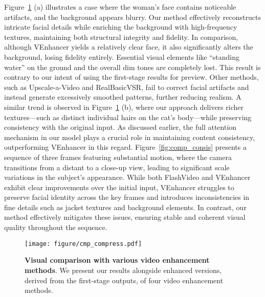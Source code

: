 Figure~\ref{fig:comp_frame} (a) illustrates a case where the woman's face contains noticeable artifacts, and the background appears blurry. Our method effectively reconstructs intricate facial details while enriching the background with high-frequency textures, maintaining both structural integrity and fidelity. 
In comparison, although VEnhancer yields a relatively clear face, it also significantly alters the background, losing fidelity entirely. Essential visual elements like ``standing water'' on the ground and the overall dim tones are completely lost. This result is contrary to our intent of using the first-stage results for preview. Other methods, such as Upscale-a-Video and RealBasicVSR, fail to correct facial artifacts and instead generate excessively smoothed patterns, further reducing realism. A similar trend is observed in Figure~\ref{fig:comp_frame} (b), where our approach delivers richer textures—such as distinct individual hairs on the cat’s body—while preserving consistency with the original input.
\label{sec:3d_attn}As discussed earlier, the full attention mechanism in our model plays a crucial role in maintaining content consistency, outperforming VEnhancer in this regard. Figure~\ref{fig:comp_consis} presents a sequence of three frames featuring substantial motion, where the camera transitions from a distant to a close-up view, leading to significant scale variations in the subject’s appearance. While both FlashVideo and VEnhancer exhibit clear improvements over the initial input, VEnhancer struggles to preserve facial identity across the key frames and introduces inconsistencies in fine details such as jacket textures and background elements. In contrast, our method effectively mitigates these issues, ensuring stable and coherent visual quality throughout the sequence.






\begin{figure}[!t]
\begin{center}
\texttt{[image: figure/cmp\_compress.pdf]}
\end{center}
\caption{\textbf{Visual comparison with various video enhancement methods}. We present our results alongside enhanced versions, derived from the first-stage outputs, of four video enhancement methods.}

\label{fig:comp_frame}
\end{figure}







